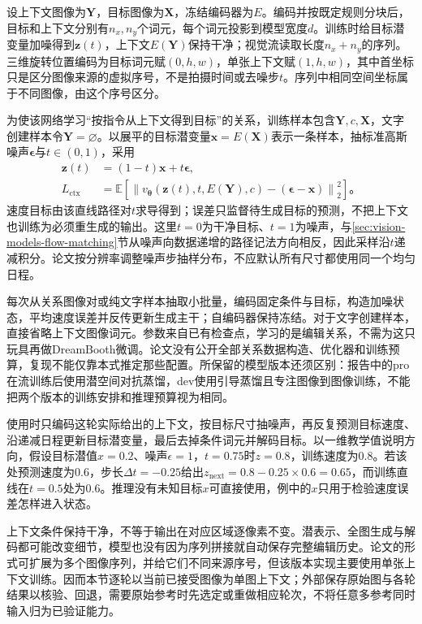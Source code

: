 设上下文图像为$\bm{Y}$，目标图像为$\bm{X}$，冻结编码器为$E$。编码并按既定规则分块后，目标和上下文分别有$n_x,n_y$个词元，每个词元投影到模型宽度$d$。训练时给目标潜变量加噪得到$\bm{z}(t)$，上下文$E(\bm{Y})$保持干净；视觉流读取长度$n_x+n_y$的序列。三维旋转位置编码为目标词元赋$(0,h,w)$，单张上下文赋$(1,h,w)$，其中首坐标只是区分图像来源的虚拟序号，不是拍摄时间或去噪步$t$。序列中相同空间坐标属于不同图像，由这个序号区分。

为使该网络学习“按指令从上下文得到目标”的关系，训练样本包含$\bm{Y},c,\bm{X}$，文字创建样本令$\bm{Y}=\varnothing$。以展平的目标潜变量$\bm{x}=E(\bm{X})$表示一条样本，抽标准高斯噪声$\bm{\epsilon}$与$t\in(0,1)$，采用
\begin{equation}
 \begin{aligned}
 \bm{z}(t)&=(1-t)\bm{x}+t\bm{\epsilon},\\
 L_{\mathrm{ctx}}&=
 \mathbb{E}\!\left[
 \left\lVert v_{\bm{\theta}}
  (\bm{z}(t),t,E(\bm{Y}),c)
   -(\bm{\epsilon}-\bm{x})\right\rVert_2^2
 \right]\text{。}
 \end{aligned}
 \label{eq:vision-kontext-flow}
\end{equation}
速度目标由该直线路径对$t$求导得到；误差只监督待生成目标的预测，不把上下文也训练为必须重生成的输出。这里$t=0$为干净目标、$t=1$为噪声，与\ref{sec:vision-models-flow-matching}节从噪声向数据递增的路径记法方向相反，因此采样沿$t$递减积分。论文按分辨率调整噪声步抽样分布，不应默认所有尺寸都使用同一个均匀日程。

每次从关系图像对或纯文字样本抽取小批量，编码固定条件与目标，构造加噪状态，平均速度误差并反传更新生成主干；自编码器保持冻结。对于文字创建样本，直接省略上下文图像词元。参数来自已有检查点，学习的是编辑关系，不需为这只玩具再做DreamBooth微调。论文没有公开全部关系数据构造、优化器和训练预算，复现不能仅靠本式推定那些配置。所保留的模型版本还须区别：报告中的pro在流训练后使用潜空间对抗蒸馏，dev使用引导蒸馏且专注图像到图像训练，不能把两个版本的训练安排和推理预算视为相同。

使用时只编码这轮实际给出的上下文，按目标尺寸抽噪声，再反复预测目标速度、沿递减日程更新目标潜变量，最后去掉条件词元并解码目标。以一维教学值说明方向，假设目标潜值$x=0.2$、噪声$\epsilon=1$，$t=0.75$时$z=0.8$，训练速度为0.8。若该处预测速度为0.6，步长$\Delta t=-0.25$给出$z_{\mathrm{next}}=0.8-0.25\times0.6=0.65$，而训练直线在$t=0.5$处为0.6。推理没有未知目标$x$可直接使用，例中的$x$只用于检验速度误差怎样进入状态。

上下文条件保持干净，不等于输出在对应区域逐像素不变。潜表示、全图生成与解码都可能改变细节，模型也没有因为序列拼接就自动保存完整编辑历史。论文的形式可扩展为多个图像序列，并给它们不同来源序号，但该版本实现主要使用单张上下文训练。因而本节逐轮以当前已接受图像为单图上下文；外部保存原始图与各轮结果以核验、回退，需要原始参考时先选定或重做相应轮次，不将任意多参考同时输入归为已验证能力。

